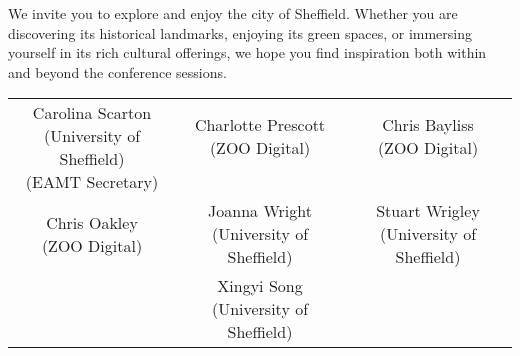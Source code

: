 We invite you to explore and enjoy the city of Sheffield. Whether you are discovering its historical landmarks, enjoying its green spaces, or immersing yourself in its rich cultural offerings, we hope you find inspiration both within and beyond the conference sessions.
\\

\begin{center}
\begin{tabular}{ c c c}
	\makecell{Carolina Scarton \\ (University of Sheffield) \\ (EAMT Secretary) \\ \vspace{0.5cm}} & \makecell{Charlotte Prescott \\ (ZOO Digital) \\ \\ \vspace{0.5cm}} & \makecell{Chris Bayliss \\ (ZOO Digital) \\ \\ \vspace{0.5cm}} \\ 
	\makecell{Chris Oakley \\ (ZOO Digital)\\ \vspace{0.5cm}} & \makecell{Joanna Wright \\ (University of Sheffield)\\ \vspace{0.5cm}} & \makecell{Stuart Wrigley \\ (University of Sheffield)\\ \vspace{0.5cm}} \\
	& \makecell{Xingyi Song \\ (University of Sheffield)} &   \\

\end{tabular}
\end{center}




